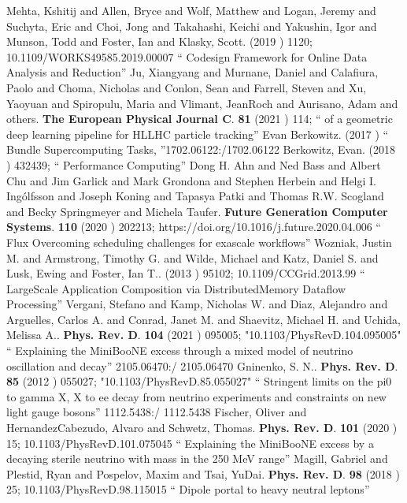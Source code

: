 \documentclass{article}
\begin{document}
\begin{thebibliography}{99}
 Mehta, Kshitij and Allen, Bryce and Wolf, Matthew and Logan, Jeremy and Suchyta, Eric and Choi, Jong and Takahashi, Keichi and Yakushin, Igor and Munson, Todd and Foster, Ian and Klasky, Scott. (2019 ) 1120; {10.1109/WORKS49585.2019.00007} `` Codesign Framework for Online Data Analysis and Reduction''
 Ju, Xiangyang and Murnane, Daniel and Calafiura, Paolo and Choma, Nicholas and Conlon, Sean and Farrell, Steven and Xu, Yaoyuan and Spiropulu, Maria and Vlimant, JeanRoch and Aurisano, Adam and others. {\bf The European Physical Journal C}. {\bf 81} (2021 ) 114; `` of a geometric deep learning pipeline for HLLHC particle tracking''
 Evan Berkowitz. (2017 ) `` Bundle Supercomputing Tasks, ''1702.06122:/1702.06122
 Berkowitz, Evan. (2018 ) 432439; `` Performance Computing''
  Dong H. Ahn and Ned Bass and Albert Chu and Jim Garlick and Mark Grondona and Stephen Herbein and Helgi I. Ingólfsson and Joseph Koning and Tapasya Patki and Thomas R.W. Scogland and Becky Springmeyer and Michela Taufer. {\bf  Future Generation Computer Systems}. {\bf  110} (2020 )  202213;  {https://doi.org/10.1016/j.future.2020.04.006} `` Flux Overcoming scheduling challenges for exascale workflows''
 Wozniak, Justin M. and Armstrong, Timothy G. and Wilde, Michael and Katz, Daniel S. and Lusk, Ewing and Foster, Ian T.. (2013 ) 95102; {10.1109/CCGrid.2013.99} `` LargeScale Application Composition via DistributedMemory Dataflow Processing''
  Vergani, Stefano and Kamp, Nicholas W. and Diaz, Alejandro and Arguelles, Carlos A. and Conrad, Janet M. and Shaevitz, Michael H. and Uchida, Melissa A.. {\bf  Phys. Rev. D}. {\bf  104} (2021 )  095005;  "10.1103/PhysRevD.104.095005" `` Explaining the MiniBooNE excess through a mixed model of neutrino oscillation and decay'' 2105.06470:/ 2105.06470
  Gninenko, S. N.. {\bf  Phys. Rev. D}. {\bf  85} (2012 )  055027;  "10.1103/PhysRevD.85.055027" `` Stringent limits on the pi0 to gamma X, X to ee decay from neutrino experiments and constraints on new light gauge bosons'' 1112.5438:/ 1112.5438
  Fischer, Oliver and HernandezCabezudo, Alvaro and Schwetz, Thomas. {\bf  Phys. Rev. D}. {\bf  101} (2020 )  15;  {10.1103/PhysRevD.101.075045} `` Explaining the MiniBooNE excess by a decaying sterile neutrino with mass in the 250 MeV range''
  Magill, Gabriel and Plestid, Ryan and Pospelov, Maxim and Tsai, YuDai. {\bf  Phys. Rev. D}. {\bf  98} (2018 )  25;  {10.1103/PhysRevD.98.115015} `` Dipole portal to heavy neutral leptons''

\end{thebibliography}
\end{document}
